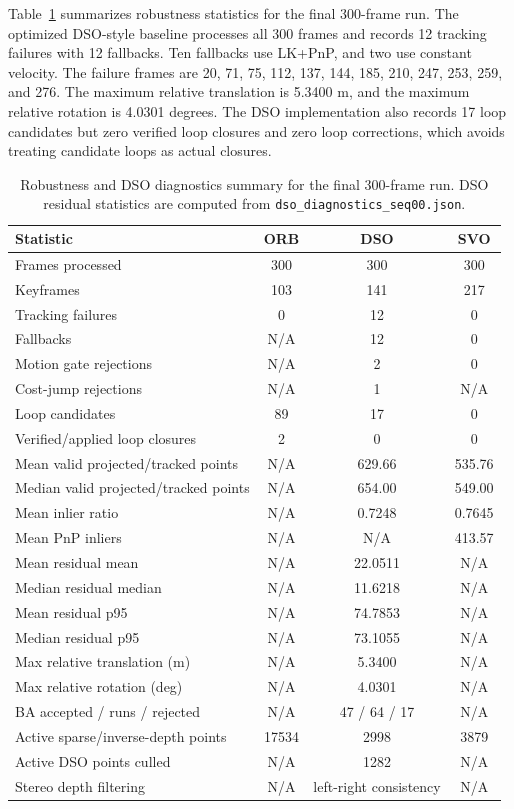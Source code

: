 \documentclass[11pt,a4paper]{article}
\newcommand{\NA}{\textsc{N/A}}
\begin{document}
Table~\ref{tab:diagnostics} summarizes robustness statistics for the final 300-frame run. The optimized DSO-style baseline processes all 300 frames and records 12 tracking failures with 12 fallbacks. Ten fallbacks use LK+PnP, and two use constant velocity. The failure frames are 20, 71, 75, 112, 137, 144, 185, 210, 247, 253, 259, and 276. The maximum relative translation is 5.3400 m, and the maximum relative rotation is 4.0301 degrees. The DSO implementation also records 17 loop candidates but zero verified loop closures and zero loop corrections, which avoids treating candidate loops as actual closures.

\begin{table}[H]
\centering
\scriptsize
\caption{Robustness and DSO diagnostics summary for the final 300-frame run. DSO residual statistics are computed from \texttt{dso\_diagnostics\_seq00.json}.}
\label{tab:diagnostics}
\begin{tabular}{lccc}
\toprule
Statistic & ORB & DSO & SVO \\
\midrule
Frames processed & 300 & 300 & 300 \\
Keyframes & 103 & 141 & 217 \\
Tracking failures & 0 & 12 & 0 \\
Fallbacks & \NA{} & 12 & 0 \\
Motion gate rejections & \NA{} & 2 & 0 \\
Cost-jump rejections & \NA{} & 1 & \NA{} \\
Loop candidates & 89 & 17 & 0 \\
Verified/applied loop closures & 2 & 0 & 0 \\
Mean valid projected/tracked points & \NA{} & 629.66 & 535.76 \\
Median valid projected/tracked points & \NA{} & 654.00 & 549.00 \\
Mean inlier ratio & \NA{} & 0.7248 & 0.7645 \\
Mean PnP inliers & \NA{} & \NA{} & 413.57 \\
Mean residual mean & \NA{} & 22.0511 & \NA{} \\
Median residual median & \NA{} & 11.6218 & \NA{} \\
Mean residual p95 & \NA{} & 74.7853 & \NA{} \\
Median residual p95 & \NA{} & 73.1055 & \NA{} \\
Max relative translation (m) & \NA{} & 5.3400 & \NA{} \\
Max relative rotation (deg) & \NA{} & 4.0301 & \NA{} \\
BA accepted / runs / rejected & \NA{} & 47 / 64 / 17 & \NA{} \\
Active sparse/inverse-depth points & 17534 & 2998 & 3879 \\
Active DSO points culled & \NA{} & 1282 & \NA{} \\
Stereo depth filtering & \NA{} & left-right consistency & \NA{} \\
\bottomrule
\end{tabular}
\end{table}
\end{document}
